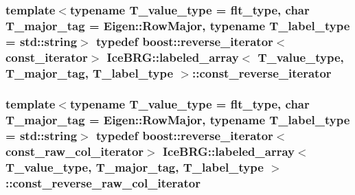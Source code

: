 \subsubsection[{const\+\_\+reverse\+\_\+iterator}]{\setlength{\rightskip}{0pt plus 5cm}template$<$typename T\+\_\+value\+\_\+type = flt\+\_\+type, char T\+\_\+major\+\_\+tag = Eigen\+::\+Row\+Major, typename T\+\_\+label\+\_\+type = std\+::string$>$ typedef boost\+::reverse\+\_\+iterator$<${\bf const\+\_\+iterator}$>$ {\bf Ice\+B\+R\+G\+::labeled\+\_\+array}$<$ T\+\_\+value\+\_\+type, T\+\_\+major\+\_\+tag, T\+\_\+label\+\_\+type $>$\+::{\bf const\+\_\+reverse\+\_\+iterator}}\label{classIceBRG_1_1labeled__array_a5088e7c1e054a6f2d6067664ee29fafb}
\hypertarget{classIceBRG_1_1labeled__array_a397a1dbf20485f08dcf6b6a7b746d403}{}
\subsubsection[{const\+\_\+reverse\+\_\+raw\+\_\+col\+\_\+iterator}]{\setlength{\rightskip}{0pt plus 5cm}template$<$typename T\+\_\+value\+\_\+type = flt\+\_\+type, char T\+\_\+major\+\_\+tag = Eigen\+::\+Row\+Major, typename T\+\_\+label\+\_\+type = std\+::string$>$ typedef boost\+::reverse\+\_\+iterator$<${\bf const\+\_\+raw\+\_\+col\+\_\+iterator}$>$ {\bf Ice\+B\+R\+G\+::labeled\+\_\+array}$<$ T\+\_\+value\+\_\+type, T\+\_\+major\+\_\+tag, T\+\_\+label\+\_\+type $>$\+::{\bf const\+\_\+reverse\+\_\+raw\+\_\+col\+\_\+iterator}}\label{classIceBRG_1_1labeled__array_a397a1dbf20485f08dcf6b6a7b746d403}
\hypertarget{classIceBRG_1_1labeled__array_ae4061b413f50fe4f35caacf5318ba324}{}
